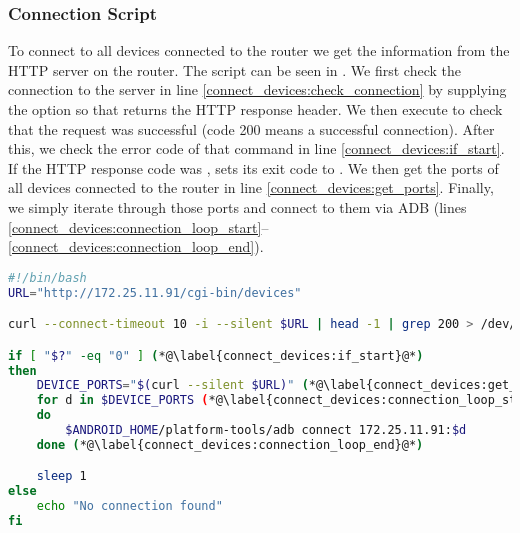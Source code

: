 \subsubsection{Connection Script}
To connect to all devices connected to the router we get the information from the HTTP server on the router. The script can be seen in . We first check the connection to the server in line \ref{connect_devices:check_connection} by supplying the  option so that  returns the HTTP response header. We then execute  to check that the request was successful (code 200 means a successful connection). After this, we check the error code of that command in line \ref{connect_devices:if_start}. If the HTTP response code was ,  sets its exit code to . We then get the ports of all devices connected to the router in line \ref{connect_devices:get_ports}. Finally, we simply iterate through those ports and connect to them via ADB (lines \ref{connect_devices:connection_loop_start}--\ref{connect_devices:connection_loop_end}).

\begin{lstlisting}[float=tbp,language=bash,caption=Bash script that connects to devices,label=lst:connect_devices]
#!/bin/bash
URL="http://172.25.11.91/cgi-bin/devices"

curl --connect-timeout 10 -i --silent $URL | head -1 | grep 200 > /dev/null (*@\label{connect_devices:check_connection}@*)

if [ "$?" -eq "0" ] (*@\label{connect_devices:if_start}@*)
then
    DEVICE_PORTS="$(curl --silent $URL)" (*@\label{connect_devices:get_ports}@*)
    for d in $DEVICE_PORTS (*@\label{connect_devices:connection_loop_start}@*)
    do
        $ANDROID_HOME/platform-tools/adb connect 172.25.11.91:$d
    done (*@\label{connect_devices:connection_loop_end}@*)

    sleep 1
else
    echo "No connection found"
fi
\end{lstlisting}

